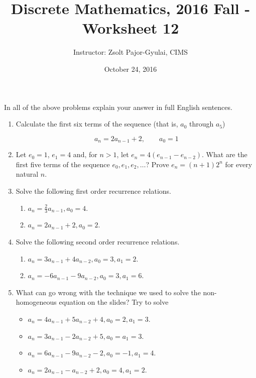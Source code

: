 \documentclass[11pt]{preprint}
\title{Discrete Mathematics, 2016 Fall - Worksheet 12}
\author{Instructor: Zsolt Pajor-Gyulai, CIMS}
\date{October 24, 2016}
\def\enumb{\begin{enumerate}}
\def\enume{\end{enumerate}}
\def\itemb{\begin{itemize}}
\def\iteme{\end{itemize}}
\begin{document}
\maketitle

In all of the above problems explain your answer in full English sentences.
\enumb

\item Calculate the first six terms of the sequence (that is, $a_0$ through $a_5$) 

\[
a_n=2a_{n-1}+2,\qquad a_0=1
\]

\item Let $e_0=1$, $e_1=4$ and, for $n>1$, let $e_n=4(e_{n-1}-e_{n-2})$. What are the first five terms of the sequence $e_0,e_1,e_2,\dots$? Prove $e_n=(n+1)2^n$ for every natural $n$.


\item Solve the following first order recurrence relations.
\enumb
\item $a_n=\frac{2}{3}a_{n-1}, a_0=4$.
\item $a_n=2a_{n-1}+2,a_0=2$.
\enume

\item Solve the following second order recurrence relations.
\enumb
\item $a_n=3a_{n-1}+4a_{n-2}, a_0=3, a_1=2$.
\item $a_n=-6a_{n-1}-9a_{n-2}, a_0=3, a_1=6$.
\enume
\item What can go wrong with the technique we used to solve the non-homogeneous equation on the slides? Try to solve
\itemb
\item $a_n=4a_{n-1}+5a_{n-2}+4, a_0=2, a_1=3$.
\item $a_n=3a_{n-1}-2a_{n-2}+5, a_0=a_1=3$.
\item $a_n=6a_{n-1}-9a_{n-2}-2,a_0=-1,a_1=4$.
\item $a_n=2a_{n-1}-a_{n-2}+2,a_0=4,a_1=2$.
\iteme
\enume
\end{document}

